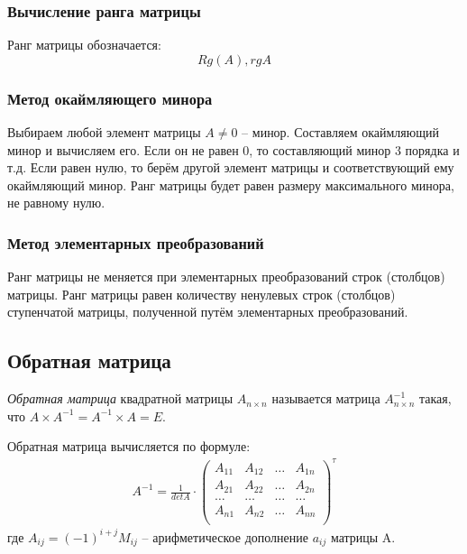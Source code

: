 \subsubsection{Вычисление ранга матрицы}

Ранг матрицы обозначается: \[
  Rg(A), rg A
\] 

\subsubsection*{Метод окаймляющего минора} 

Выбираем любой элемент матрицы $A \neq 0$ -- минор.
Составляем окаймляющий минор и вычисляем его. Если он не равен 0, то составляющий минор 3 порядка и т.д.
Если равен нулю, то берём другой элемент матрицы и соответствующий ему окаймляющий минор.
Ранг матрицы будет равен размеру максимального минора, не равному нулю.

\subsubsection*{Метод элементарных преобразований}

\begin{theorem}
  Ранг матрицы не меняется при элементарных преобразований строк (столбцов) матрицы.
  Ранг матрицы равен количеству ненулевых строк (столбцов) ступенчатой матрицы, полученной путём элементарных преобразований.
\end{theorem}

\subsection{Обратная матрица}

\begin{definition}
  \textit{Обратная матрица} квадратной матрицы $A_{n \times n}$ называется матрица $A^{-1}_{n \times n}$ такая, что $A \times A^{-1} = A^{-1} \times A = E$.
\end{definition}

Обратная матрица вычисляется по формуле:
\begin{gather*}
  \boxed{
    A^{-1} = \frac{1}{det A} \cdot 
    \begin{pmatrix}
      A_{11} & A_{12} & \ldots & A_{1n} \\
      A_{21} & A_{22} & \ldots & A_{2n} \\
      \ldots & \ldots & \ldots & \ldots \\
      A_{n1} & A_{n2} & \ldots & A_{nn} \\
    \end{pmatrix} ^ \tau
  }
\end{gather*}
где $A_{ij} = (-1)^{i+j} M_{ij}$ -- арифметическое дополнение $a_{ij}$ матрицы A.

